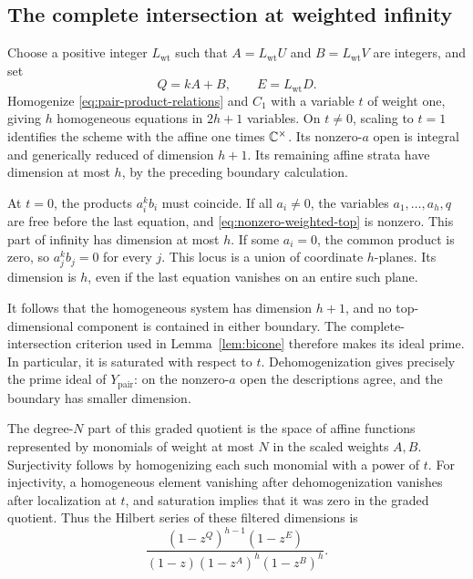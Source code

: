\subsection{The complete intersection at weighted infinity}

Choose a positive integer \(L_{\mathrm{wt}}\) such that
\(A=L_{\mathrm{wt}}U\) and \(B=L_{\mathrm{wt}}V\) are integers, and set
\[
 Q=kA+B,\qquad E=L_{\mathrm{wt}}D.
\]
Homogenize \eqref{eq:pair-product-relations} and \(C_1\) with a
variable \(t\) of weight one, giving \(h\) homogeneous equations
in \(2h+1\) variables.  On \(t\ne0\), scaling to \(t=1\)
identifies the scheme with the affine one times \(\mathbb C^\times\).
Its nonzero-\(a\) open is integral and generically reduced of
dimension \(h+1\).  Its remaining affine strata have dimension
at most \(h\), by the preceding boundary calculation.

At \(t=0\), the products \(a_i^kb_i\) must coincide.
If all \(a_i\ne0\), the variables \(a_1,\ldots,a_h,q\) are free
before the last equation, and \eqref{eq:nonzero-weighted-top}
is nonzero.  This part of infinity has dimension at most \(h\).
If some \(a_i=0\), the common product is zero, so
\(a_j^kb_j=0\) for every \(j\).  This locus is a union of
coordinate \(h\)-planes.  Its dimension is \(h\), even if the
last equation vanishes on an entire such plane.

It follows that the homogeneous system has dimension \(h+1\),
and no top-dimensional component is contained in either boundary.
The complete-intersection criterion used in Lemma~\ref{lem:bicone}
therefore makes its ideal prime.  In particular, it is saturated
with respect to \(t\).  Dehomogenization gives precisely the prime
ideal of \(Y_{\mathrm{pair}}\): on the nonzero-\(a\) open the
descriptions agree, and the boundary has smaller dimension.

The degree-\(N\) part of this graded quotient is the space of
affine functions represented by monomials of weight at most \(N\)
in the scaled weights \(A,B\).  Surjectivity follows by
homogenizing each such monomial with a power of \(t\).
For injectivity, a homogeneous element vanishing after
dehomogenization vanishes after localization at \(t\), and
saturation implies that it was zero in the graded quotient.
Thus the Hilbert series of these filtered dimensions is
\begin{equation}
 \frac{(1-z^Q)^{h-1}(1-z^E)}
 {(1-z)(1-z^A)^h(1-z^B)^h}.
 \label{eq:weighted-hilbert-series}
\end{equation}


